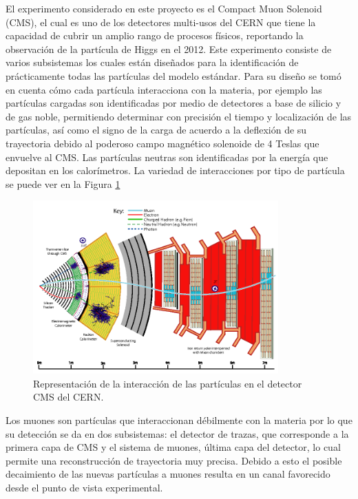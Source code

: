 El experimento considerado en este proyecto es el Compact Muon Solenoid (CMS), el cual es uno de los detectores multi-usos del CERN que tiene la capacidad de cubrir un amplio rango de procesos físicos, reportando la observación de la partícula de Higgs en el 2012. Este experimento consiste de varios subsistemas los cuales están diseñados para la identificación de prácticamente todas las partículas del modelo estándar. Para su diseño se tomó en cuenta cómo cada partícula interacciona con la materia, por ejemplo las partículas cargadas son identificadas por medio de detectores a base de silicio y de gas noble, permitiendo determinar con precisión el tiempo y localización de las partículas, así como el signo de la carga de acuerdo a la deflexión de su trayectoria debido al poderoso campo magnético solenoide de 4 Teslas que envuelve al CMS. Las partículas neutras son identificadas por la energía que depositan en los calorímetros. La variedad de interacciones por tipo de partícula se puede ver en la Figura \ref{fig:cms_interaction}

\begin{figure}
    \centering
    \includegraphics[width=0.84\textwidth]{ANTECEDENTES/CMS_interaction.png}
    \caption{Representación de la interacción de las partículas en el detector CMS del CERN.}
    \label{fig:cms_interaction}
\end{figure}

Los muones son partículas que interaccionan débilmente con la materia por lo que su detección se da en dos subsistemas: el detector de trazas, que corresponde a la primera capa de CMS y el sistema de muones, última capa del detector, lo cual permite una reconstrucción de trayectoria muy precisa. Debido a esto el posible decaimiento de las nuevas partículas a muones resulta en un canal favorecido desde el punto de vista experimental.



























